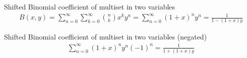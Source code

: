 \begin{identity}
    Shifted Binomial coefficient of multiset in two variables~\cite[eq. 15]{faris2011generating}
    \begin{align*}
        B(x, y) = \sum_{n=0}^{\infty} \sum_{k=0}^{\infty} \binom{n}{k} x^k y^n
        = \sum_{n=0}^{\infty} (1 + x)^n y^n = \frac{1}{1 - (1 + x)y}
    \end{align*}
\end{identity}
\begin{identity}
    Shifted Binomial coefficient of multiset in two variables (negated)
    \begin{align*}
        \sum_{n=0}^{\infty} (1 + x)^n y^n (-1)^n = \frac{1}{1 + (1 + x)y}
    \end{align*}
\end{identity}
